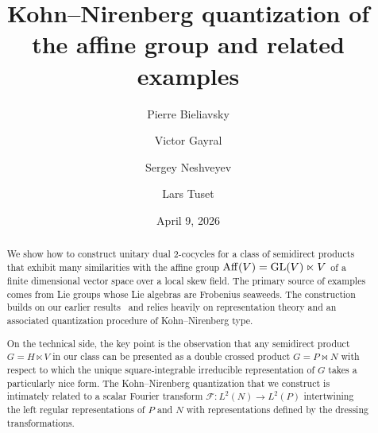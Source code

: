 \documentclass[a4paper,11pt,reqno]{amsart}
\numberwithin{equation}{section}
\theoremstyle{remark}
\theoremstyle{definition}
\newcommand{\CF}{\mathcal F}
\newcommand{\GL}{\operatorname{GL}}
\begin{document}
\date{April 9, 2026}

\title{Kohn--Nirenberg quantization of the affine group and related examples}

\author[Bieliavsky]{Pierre Bieliavsky}
\address{Institut de Recherche en Math\'ematique et Physique, Universit\'e Catholique de Louvain, Chemin du Cyclotron, 2, 1348 Louvain-la-Neuve, Belgium}

\author[Gayral]{Victor Gayral}
\address{Laboratoire de Math\'ematiques, CNRS UMR 9008, Universit\'e de Reims Champagne-Ardenne,
Moulin de la Housse - BP 1039,
51687 Reims, France}

\author[Neshveyev]{Sergey Neshveyev}
\address{Department of Mathematics, University of Oslo,
P.O. Box 1053 Blindern, NO-0316 Oslo, Norway}


\author[Tuset]{Lars Tuset}
\address{Department of Computer Science, OsloMet - storbyuniversitetet,
P.O. Box 4 St. Olavs plass, NO-0130 Oslo, Norway}

\begin{abstract}
We show how to construct unitary dual $2$-cocycles  for a class of semidirect products that exhibit many similarities with the affine
group ${\rm Aff}(V)=\GL(V)\ltimes V$ of a finite dimensional vector space over a local skew field. The primary
source of examples comes from Lie groups  whose Lie algebras are Frobenius seaweeds.
The construction builds on our earlier results~\cite{BGNT3} and relies heavily on representation theory and an associated quantization procedure of Kohn--Nirenberg type.

On the technical side, the key point is the observation that any semidirect product  $G=H\ltimes V$ in our class can be presented
as a double crossed product $G=P\bowtie N$ with respect to which the unique square-integrable irreducible representation of $G$ takes a particularly nice form. The Kohn--Nirenberg quantization that we construct is intimately related to a scalar Fourier transform
$\CF\colon L^2(N)\to L^2(P)$ intertwining the left regular representations  of $P$ and $N$ with representations defined  by the dressing transformations.
\end{abstract}

\maketitle
\end{document}
